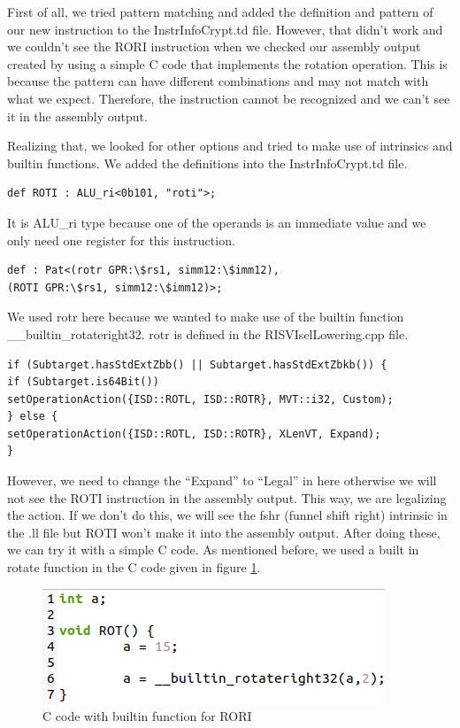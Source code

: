 First of all, we tried pattern matching and added the definition and pattern of our new instruction to the InstrInfoCrypt.td file. However, that didn’t work and we couldn’t see the RORI instruction when we checked our assembly output created by using a simple C code that implements the rotation operation. This is because the pattern can have different combinations and may not match with what we expect. Therefore, the instruction cannot be recognized and we can’t see it in the assembly output.

Realizing that, we looked for other options and tried to make use of intrinsics and builtin functions. We added the definitions into the InstrInfoCrypt.td file.

\begin{lstlisting}
def ROTI : ALU_ri<0b101, "roti">;
\end{lstlisting}

It is ALU\_ri type because one of the operands is an immediate value and we only need one register for this instruction.

\begin{lstlisting}
def : Pat<(rotr GPR:\$rs1, simm12:\$imm12),
(ROTI GPR:\$rs1, simm12:\$imm12)>;
\end{lstlisting}

We used rotr here because we wanted to make use of the builtin function \_\_builtin\_rotateright32. rotr is defined in the RISVIselLowering.cpp file.

\begin{lstlisting}
if (Subtarget.hasStdExtZbb() || Subtarget.hasStdExtZbkb()) {
if (Subtarget.is64Bit())
setOperationAction({ISD::ROTL, ISD::ROTR}, MVT::i32, Custom);
} else {
setOperationAction({ISD::ROTL, ISD::ROTR}, XLenVT, Expand); 
}
\end{lstlisting}

However, we need to change the “Expand” to “Legal” in here otherwise we will not see the ROTI instruction in the assembly output.  This way, we are legalizing the action. If we don’t do this, we will see the fshr (funnel shift right) intrinsic in the .ll file but ROTI won’t make it into the assembly output. After doing these, we can try it with a simple C code. As mentioned before, we used a built in rotate function in the C code given in figure \ref{fig:c_code_with_builtin_function_for_roti}.
\begin{figure}
    \centering
    \includegraphics{adding_new_instr/c_code_with_builtin_function_for_roti.png}
    \caption{C code with builtin function for RORI}
    \label{fig:c_code_with_builtin_function_for_roti}
\end{figure}

